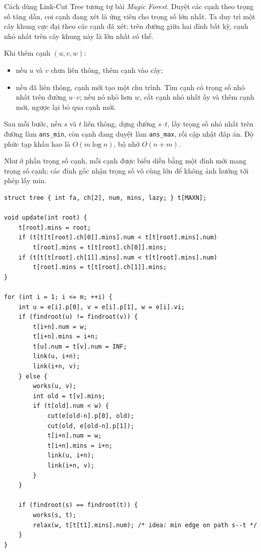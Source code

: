 \documentclass[11pt]{article}
\begin{document}
Cách dùng Link-Cut Tree tương tự bài \textit{Magic Forest}.  Duyệt các cạnh
theo trọng số tăng dần, coi cạnh đang xét là ứng viên cho trọng số lớn nhất.
Ta duy trì một cây khung cực đại theo các cạnh đã xét: trên đường giữa hai đỉnh
bất kỳ, cạnh nhỏ nhất trên cây khung này là lớn nhất có thể.

Khi thêm cạnh $(u,v,w)$:
\begin{itemize}
  \item nếu $u$ và $v$ chưa liên thông, thêm cạnh vào cây;
  \item nếu đã liên thông, cạnh mới tạo một chu trình.  Tìm cạnh có trọng số
  nhỏ nhất trên đường $u$--$v$; nếu nó nhỏ hơn $w$, cắt cạnh nhỏ nhất ấy và
  thêm cạnh mới, ngược lại bỏ qua cạnh mới.
\end{itemize}

Sau mỗi bước, nếu $s$ và $t$ liên thông, dựng đường $s$--$t$, lấy trọng số nhỏ
nhất trên đường làm \texttt{ans\_min}, còn cạnh đang duyệt làm
\texttt{ans\_max}, rồi cập nhật đáp án.  Độ phức tạp khấu hao là
$O(m\log n)$, bộ nhớ $O(n+m)$.

Như ở phần trọng số cạnh, mỗi cạnh được biểu diễn bằng một đỉnh mới mang trọng
số cạnh; các đỉnh gốc nhận trọng số vô cùng lớn để không ảnh hưởng tới phép
lấy min.

\begingroup
\small
\begin{verbatim}
struct tree { int fa, ch[2], num, mins, lazy; } t[MAXN];

void update(int root) {
    t[root].mins = root;
    if (t[t[t[root].ch[0]].mins].num < t[t[root].mins].num)
        t[root].mins = t[t[root].ch[0]].mins;
    if (t[t[t[root].ch[1]].mins].num < t[t[root].mins].num)
        t[root].mins = t[t[root].ch[1]].mins;
}

for (int i = 1; i <= m; ++i) {
    int u = e[i].p[0], v = e[i].p[1], w = e[i].vi;
    if (findroot(u) != findroot(v)) {
        t[i+n].num = w;
        t[i+n].mins = i+n;
        t[u].num = t[v].num = INF;
        link(u, i+n);
        link(i+n, v);
    } else {
        works(u, v);
        int old = t[v].mins;
        if (t[old].num < w) {
            cut(e[old-n].p[0], old);
            cut(old, e[old-n].p[1]);
            t[i+n].num = w;
            t[i+n].mins = i+n;
            link(u, i+n);
            link(i+n, v);
        }
    }

    if (findroot(s) == findroot(t)) {
        works(s, t);
        relax(w, t[t[t1].mins].num); /* idea: min edge on path s--t */
    }
}
\end{verbatim}
\endgroup
\end{document}
